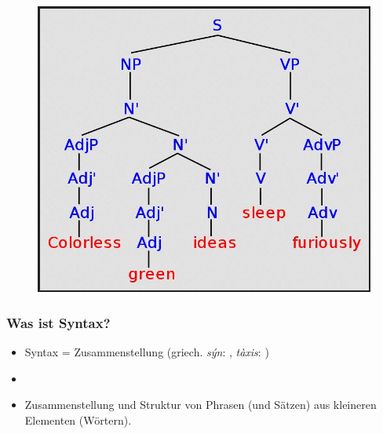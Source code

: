 \begin{frame}

\begin{figure}
\centering
	\includegraphics[scale=.3]{material/01colorless}
\end{figure}

\end{frame}


\begin{frame}
\frametitle{Was ist Syntax?}

\begin{itemize}
	\item Syntax = Zusammenstellung (griech. \emph{sýn}: , \emph{tàxis}: )
	\item[]
	\item Zusammenstellung und Struktur von Phrasen (und Sätzen) aus kleineren Elementen (Wörtern).
\end{itemize}

\end{frame}

